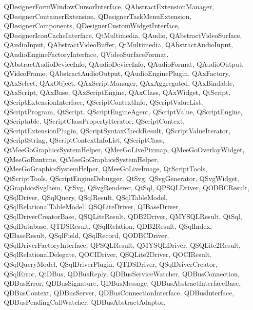 {{    QDesignerFormWindowCursorInterface,%
    QAbstractExtensionManager,%
    QDesignerContainerExtension,%
    QDesignerTaskMenuExtension,%
    QDesignerComponents,%
    QDesignerCustomWidgetInterface,%
    QDesignerIconCacheInterface,%
    QtMultimedia,%
    QAudio,%
    QAbstractVideoSurface,%
    QAudioInput,%
    QAbstractVideoBuffer,%
    QtMultimedia,%
    QAbstractAudioInput,%
    QAudioEngineFactoryInterface,%
    QVideoSurfaceFormat,%
    QAbstractAudioDeviceInfo,%
    QAudioDeviceInfo,%
    QAudioFormat,%
    QAudioOutput,%
    QVideoFrame,%
    QAbstractAudioOutput,%
    QAudioEnginePlugin,%
    QAxFactory,%
    QAxSelect,%
    QAxObject,%
    QAxScriptManager,%
    QAxAggregated,%
    QAxBindable,%
    QAxScript,%
    QAxBase,%
    QAxScriptEngine,%
    QAxClass,%
    QAxWidget,%
    QtScript,%
    QScriptExtensionInterface,%
    QScriptContextInfo,%
    QScriptValueList,%
    QScriptProgram,%
    QtScript,%
    QScriptEngineAgent,%
    QScriptValue,%
    QScriptEngine,%
    QScriptable,%
    QScriptClassPropertyIterator,%
    QScriptContext,%
    QScriptExtensionPlugin,%
    QScriptSyntaxCheckResult,%
    QScriptValueIterator,%
    QScriptString,%
    QScriptContextInfoList,%
    QScriptClass,%
    QtMeeGoGraphicsSystemHelper,%
    QMeeGoLivePixmap,%
    QMeeGoOverlayWidget,%
    QMeeGoRuntime,%
    QtMeeGoGraphicsSystemHelper,%
    QMeeGoGraphicsSystemHelper,%
    QMeeGoLiveImage,%
    QtScriptTools,%
    QtScriptTools,%
    QScriptEngineDebugger,%
    QtSvg,%
    QSvgGenerator,%
    QSvgWidget,%
    QGraphicsSvgItem,%
    QtSvg,%
    QSvgRenderer,%
    QtSql,%
    QPSQLDriver,%
    QODBCResult,%
    QSqlDriver,%
    QSqlQuery,%
    QSqlResult,%
    QSqlTableModel,%
    QSqlRelationalTableModel,%
    QSQLiteDriver,%
    QIBaseDriver,%
    QSqlDriverCreatorBase,%
    QSQLiteResult,%
    QDB2Driver,%
    QMYSQLResult,%
    QtSql,%
    QSqlDatabase,%
    QTDSResult,%
    QSqlRelation,%
    QDB2Result,%
    QSqlIndex,%
    QIBaseResult,%
    QSqlField,%
    QSqlRecord,%
    QODBCDriver,%
    QSqlDriverFactoryInterface,%
    QPSQLResult,%
    QMYSQLDriver,%
    QSQLite2Result,%
    QSqlRelationalDelegate,%
    QOCIDriver,%
    QSQLite2Driver,%
    QOCIResult,%
    QSqlQueryModel,%
    QSqlDriverPlugin,%
    QTDSDriver,%
    QSqlDriverCreator,%
    QSqlError,%
    QtDBus,%
    QDBusReply,%
    QDBusServiceWatcher,%
    QDBusConnection,%
    QDBusError,%
    QDBusSignature,%
    QDBusMessage,%
    QDBusAbstractInterfaceBase,%
    QDBusContext,%
    QDBusServer,%
    QDBusConnectionInterface,%
    QDBusInterface,%
    QDBusPendingCallWatcher,%
    QDBusAbstractAdaptor,%
}}
